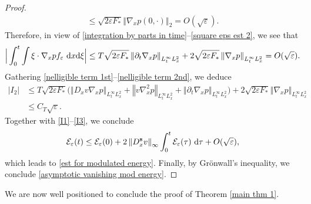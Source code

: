 \documentclass[11pt,reqno]{amsart}
\numberwithin{equation}{section}
\def\dd{{\rm d}}
\begin{document}
\begin{proof}
\begin{align}
\leq \sqrt{2\varepsilon F_*}\left\Vert \nabla_{x}p(0,\cdot)\right\Vert_{2}=O(\sqrt{\varepsilon}).\label{square eps est 2}
\end{align}
Therefore, in view of \eqref{integration by parts in time}--\eqref{square eps est 2}, we see that 
\begin{align}
\Big|\int_{0}^{t}\int \xi\cdot \nabla_{x}pf_{\varepsilon}\ \dd x\dd \xi\Big|
\leq T\sqrt{2\varepsilon F_*}\left\Vert \partial_{t}\nabla_{x}p\right\Vert_{L^{\infty}_{t}L^{2}_{x}}
+2\sqrt{2\varepsilon F_*}\left\Vert \nabla_{x}p\right\Vert_{L^{\infty}_{t}L^{2}_{x}}
=O(\sqrt{\varepsilon}). \label{nelligible term 2nd}
\end{align}
Gathering \eqref{nelligible term 1st}--\eqref{nelligible term 2nd}, 
we deduce 
\begin{align*}
|I_{2}|&\leq T\sqrt{2\varepsilon F_*}\big(\left\Vert D_{x}v\nabla_{x}p\right\Vert_{L^{\infty}_{t}L^{2}_{x}}+\left\Vert v\nabla_{x}^{2}p\right\Vert_{L^{\infty}_{t}L^{2}_{x}}+\left\Vert \partial_{t}\nabla_{x}p\right\Vert_{L^{\infty}_{t}L^{2}_{x}}\big)
+2\sqrt{2\varepsilon F_*}\left\Vert \nabla_{x}p\right\Vert_{L^{\infty}_{t}L^{2}_{x}}\\
&\leq C_T\sqrt\varepsilon.
\end{align*}
Together with \eqref{I1}--\eqref{I3}, we conclude
\begin{align*}
\mathcal{E}_{\varepsilon}(t)\leq \mathcal{E}_{\varepsilon}(0)+2\left\Vert D^{\mathbf{s}}_{x}v\right\Vert_{\infty} \int_{0}^{t}\mathcal{E}_{\varepsilon}(\tau)\ \dd \tau+O(\sqrt{\varepsilon}),   
\end{align*}
 which leads to  \eqref{est for modulated energy}. 
 Finally, by Gr\"onwall's inequality, 
 we conclude \eqref{asymptotic vanishing mod energy}.  
\end{proof}

We are now well positioned to conclude the proof of Theorem \ref{main thm 1}.
\end{document}
